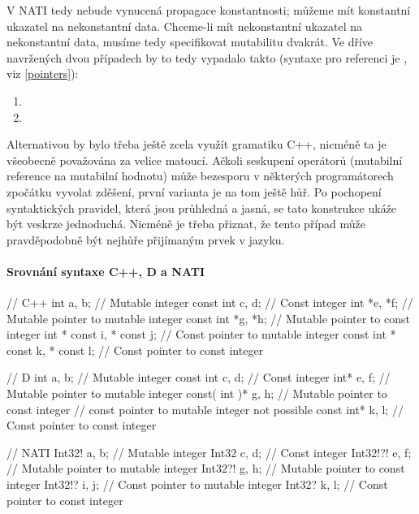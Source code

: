 V NATI tedy nebude vynucená propagace konstantnosti; můžeme mít konstantní ukazatel na nekonstantní data. Chceme-li mít nekonstantní ukazatel na nekonstantní data, musíme tedy specifikovat mutabilitu dvakrát. Ve dříve navržených dvou případech by to tedy vypadalo takto (syntaxe pro referenci je , viz \ref{pointers}):
\begin{enumerate}
	\item {}
	\item {}
\end{enumerate}

Alternativou by bylo třeba ještě zcela využít gramatiku C++, nicméně ta je všeobecně považována za velice matoucí. Ačkoli seskupení operátorů  (mutabilní reference na mutabilní hodnotu) může bezesporu v některých programátorech zpočátku vyvolat zděšení, první varianta je na tom ještě hůř. Po pochopení syntaktických pravidel, která jsou průhledná a jasná, se tato konstrukce ukáže být veskrze jednoduchá. Nicméně je třeba přiznat, že tento případ může pravděpodobně být nejhůře přijímaným prvek v jazyku.

\paragraph{Srovnání syntaxe C++, D a NATI}
\begin{cppcode}
	// C++
	int a, b; // Mutable integer
	const int c, d; // Const integer
	int *e, *f; // Mutable pointer to mutable integer
	const int *g, *h; // Mutable pointer to const integer
	int * const i, * const j; // Const pointer to mutable integer
	const int * const k, * const l; // Const pointer to const integer
\end{cppcode}
\begin{dcode}
	// D
	int a, b; // Mutable integer
	const int c, d; // Const integer
	int* e, f; // Mutable pointer to mutable integer
	const( int )* g, h; // Mutable pointer to const integer
	// const pointer to mutable integer not possible
	const int* k, l; // Const pointer to const integer
\end{dcode}
\begin{code}
	// NATI
	Int32! a, b; // Mutable integer
	Int32 c, d; // Const integer
	Int32!?! e, f; // Mutable pointer to mutable integer
	Int32?! g, h; // Mutable pointer to const integer
	Int32!? i, j; // Const pointer to mutable integer
	Int32? k, l; // Const pointer to const integer
\end{code}



